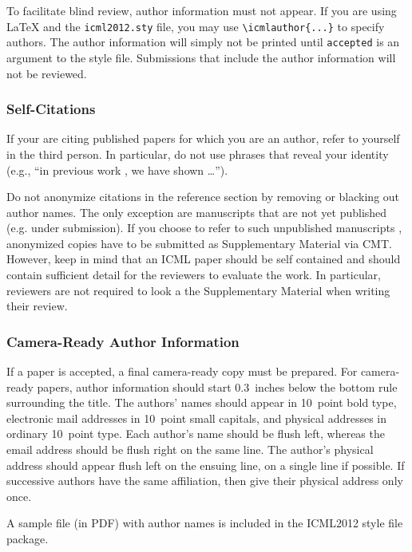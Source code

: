 \documentclass{article}
\begin{document}
To facilitate blind review, author information must not appear.  If
you are using \LaTeX\/ and the \texttt{icml2012.sty} file, you may use
\verb+\icmlauthor{...}+ to specify authors.  The author information
will simply not be printed until {\tt accepted} is an argument to the
style file. Submissions that include the author information will not
be reviewed.

\subsubsection{Self-Citations}

If your are citing published papers for which you are an author, refer
to yourself in the third person. In particular, do not use phrases
that reveal your identity (e.g., ``in previous work \cite{Bendall:2011bm}, we 
have shown \ldots'').

Do not anonymize citations in the reference section by removing or
blacking out author names. The only exception are manuscripts that are
not yet published (e.g. under submission). If you choose to refer to
such unpublished manuscripts \cite{anonymous}, anonymized copies have to be submitted
as Supplementary Material via CMT. However, keep in mind that an ICML
paper should be self contained and should contain sufficient detail
for the reviewers to evaluate the work. In particular, reviewers are
not required to look a the Supplementary Material when writing their
review.

\subsubsection{Camera-Ready Author Information}
\label{final author}

If a paper is accepted, a final camera-ready copy must be prepared.
%
For camera-ready papers, author information should start 0.3~inches
below the bottom rule surrounding the title. The authors' names should
appear in 10~point bold type, electronic mail addresses in 10~point
small capitals, and physical addresses in ordinary 10~point type.
Each author's name should be flush left, whereas the email address
should be flush right on the same line. The author's physical address
should appear flush left on the ensuing line, on a single line if
possible. If successive authors have the same affiliation, then give
their physical address only once.

A sample file (in PDF) with author names is included in the ICML2012 style file package.
\end{document}
